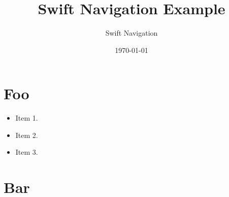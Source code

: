 \documentclass{article}
\title{Swift Navigation Example}
\author{Swift Navigation}
\date{\today}
\begin{document}
\begin{multicols*}{2}
\raggedcolumns
\maketitle

\section{Foo}
\large
\label{sec:Features}
\begin{itemize}
  \bulletnoindent
  \item Item 1.
  \item Item 2.
  \item Item 3.
\end{itemize}
\normalsize

\section{Bar}

\lipsum[1-5]

\end{multicols*} 
\end{document}
